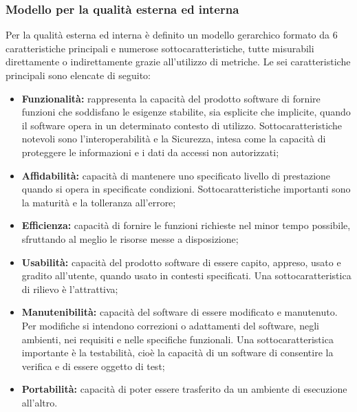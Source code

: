 \documentclass[11pt,a4paper]{article}
\begin{document}
{\subsubsection{Modello per la qualità esterna ed interna}
Per la qualità esterna ed interna è definito un modello gerarchico formato da 6 caratteristiche principali e numerose sottocaratteristiche, tutte misurabili direttamente o indirettamente grazie all'utilizzo di metriche.
Le sei caratteristiche principali sono elencate di seguito:
\begin{itemize}
	\item \textbf{Funzionalità:} rappresenta la capacità del prodotto software di fornire funzioni che soddisfano le esigenze stabilite, sia esplicite che implicite, quando il software opera in un determinato contesto di utilizzo. Sottocaratteristiche notevoli sono l'interoperabilità e la Sicurezza, intesa come la capacità di proteggere le informazioni e i dati da accessi non autorizzati;
	\item \textbf{Affidabilità:} capacità di mantenere uno specificato livello di prestazione quando si opera in specificate condizioni. Sottocaratteristiche importanti sono la maturità e la tolleranza all'errore;
	\item \textbf{Efficienza:} capacità di fornire le funzioni richieste nel minor tempo possibile, sfruttando al meglio le risorse messe a disposizione;
	\item \textbf{Usabilità:} capacità del prodotto software di essere capito, appreso, usato e gradito all'utente, quando usato in contesti specificati. Una sottocaratteristica di rilievo è l'attrattiva;
	\item \textbf{Manutenibilità:} capacità del software di essere modificato e manutenuto. Per modifiche si intendono correzioni o adattamenti del software, negli ambienti, nei requisiti e nelle specifiche funzionali. Una sottocaratteristica importante è la testabilità, cioè la capacità di un software di consentire la verifica e di essere oggetto di test;
	\item \textbf{Portabilità:} capacità di poter essere trasferito da un ambiente di esecuzione all'altro.
\end{itemize}
}
\end{document}
